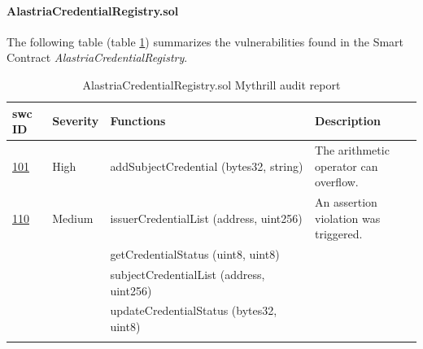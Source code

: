 \documentclass[a4paper, 12pt]{article} %
\begin{document}
            \paragraph{AlastriaCredentialRegistry.sol}
                The following table (table \ref{tab:AlastriaCredentialRegistry}) summarizes the vulnerabilities found in the Smart Contract \textit{AlastriaCredentialRegistry}.
                \begin{longtable}{||p{0.1\linewidth} | p{0.11\linewidth} | p{0.52\linewidth} | p{0.3\linewidth}||}
                    \hline
                    \textbf{\acrshort{swc} ID} & \textbf{Severity} & \textbf{Functions} & \textbf{Description} \\ [0.5ex] 
                    \hline\hline
                    \href{https://swcregistry.io/docs/SWC-101}{101} & High & addSubjectCredential (bytes32, string) & The arithmetic operator can overflow.\\ 
                    \hline
                    \href{https://swcregistry.io/docs/SWC-110}{110} & Medium & issuerCredentialList (address, uint256) & An assertion violation was triggered.\\
                    \cline{3-3}
                    & & getCredentialStatus (uint8, uint8) &\\ 
                    \cline{3-3} 
                    & & subjectCredentialList (address, uint256) &\\
                    \cline{3-3}
                    & & updateCredentialStatus (bytes32, uint8) &\\ [1ex] 
                    \hline
                    \caption{AlastriaCredentialRegistry.sol Mythrill audit report}
                    \label{tab:AlastriaCredentialRegistry}
                \end{longtable}

            \newpage
\end{document}
